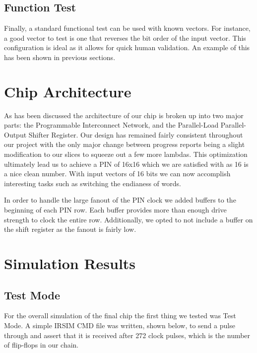 \subsection{Function Test}
Finally, a standard functional test can be used with known vectors. For
instance, a good vector to test is one that reverses the bit order of the input
vector. This configuration is ideal as it allows for quick human validation.
An example of this has been shown in previous sections.

\newpage
\section{Chip Architecture}

As has been discussed the architecture of our chip is broken up into two major
parts: the Programmable Interconnect Network, and the Parallel-Load
Parallel-Output Shifter Register. Our design has remained fairly consistent
throughout our project with the only major change between progress reports
being a slight modification to our slices to squeeze out a few more lambdas.
This optimization ultimately lead us to achieve a PIN of 16x16 which we are
satisfied with as 16 is a nice clean number. With input vectors of 16 bits we
can now accomplish interesting tasks such as switching the endianess of words.

In order to handle the large fanout of the PIN clock we added buffers to the
beginning of each PIN row. Each buffer provides more than enough drive strength
to clock the entire row. Additionally, we opted to not include a buffer on the
shift register as the fanout is fairly low.

\newpage
\section{Simulation Results}

    \subsection{Test Mode}

    For the overall simulation of the final chip the first thing we tested was
    Test Mode.  A simple IRSIM CMD file was written, shown below, to send a
    pulse through and assert that it is received after 272 clock pulses, which
    is the number of flip-flops in our chain.

    

